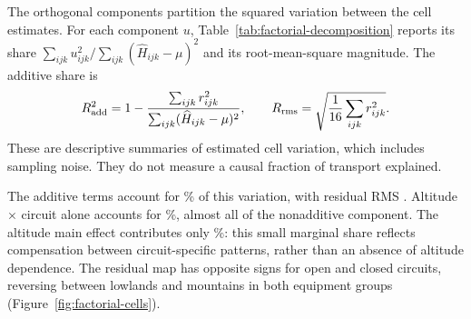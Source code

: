 The orthogonal components partition the squared variation between the cell
estimates. For each component $u$, Table~\ref{tab:factorial-decomposition}
reports its share $\sum_{ijk}u_{ijk}^2/
\sum_{ijk}(\widehat H_{ijk}-\mu)^2$ and its root-mean-square magnitude.
The additive share is
\begin{equation}
 R^2_{\rm add}=1-
 \frac{\sum_{ijk}r_{ijk}^2}
      {\sum_{ijk}(\widehat H_{ijk}-\mu)^2},
 \qquad
 R_{\rm rms}=\sqrt{\frac{1}{16}\sum_{ijk}r_{ijk}^2}.
 \label{eq:factorial-variation}
\end{equation}
These are descriptive summaries of estimated cell variation, which includes
sampling noise. They do not measure a causal fraction of transport explained.

\begin{table}[htbp]
 \centering\small
 
 \caption{Experimental partition of variation among the 16 fitted exponents,
 using equal cell weights. The degrees of freedom give subspace dimensions;
 no mean-square error or $F$ test is constructed. RMS values have the units of
 $H$. Small shares do not establish the absence of an interaction.}
 \label{tab:factorial-decomposition}
\end{table}

The additive terms account for \FactorialAddPct\% of this variation, with
residual RMS \FactorialResidualRms{}. Altitude $\times$ circuit alone accounts
for \FactorialAcPct\%, almost all of the nonadditive component. The altitude
main effect contributes only \FactorialAltPct\%: this small marginal share
reflects compensation between circuit-specific patterns, rather than an
absence of altitude dependence. The residual map has opposite signs for open
and closed circuits, reversing between lowlands and mountains in both equipment
groups (Figure~\ref{fig:factorial-cells}).

